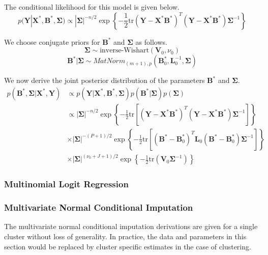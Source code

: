 \documentclass[useAMS,referee]{biom}
\newcommand{\tr}{\mbox{tr}}
\begin{document}
The conditional likelihood for this model is given below. 
$$p(\mathbf{Y}|\mathbf{X}^*,\mathbf{B}^*,\boldsymbol\Sigma) \propto |\boldsymbol\Sigma|^{-n/2}\exp \left \{ -\frac{1}{2} \tr(\mathbf{Y} - \mathbf{X}^* \mathbf{B}^*)^T(\mathbf{Y} - \mathbf{X}^* \mathbf{B}^*)\boldsymbol\Sigma^{-1} \right \}$$

We choose conjugate priors for $\mathbf{B}^*$ and $\boldsymbol\Sigma$ as follows. 
$$\boldsymbol\Sigma \sim \text{inverse-Wishart}(\mathbf{V}_0,\nu_0)$$
$$\mathbf{B}^*|\boldsymbol\Sigma \sim MatNorm_{(m+1), p}(\mathbf{B}_0^*,\mathbf{L}_0^{-1},\boldsymbol\Sigma)$$

We now derive the joint posterior distribution of the parameters $\mathbf{B}^*$ and $\boldsymbol\Sigma$.
\begin{align*} 
p(\mathbf{B}^*,\boldsymbol\Sigma|\mathbf{X}^*,\mathbf{Y}) & \propto  p(\mathbf{Y}|\mathbf{X}^*,\mathbf{B}^*,\boldsymbol\Sigma)p(\mathbf{B}^*|\boldsymbol\Sigma)p(\boldsymbol\Sigma)\\
&  \propto |\boldsymbol\Sigma|^{-n/2}\exp \left \{ -\frac{1}{2} \tr \left [(\mathbf{Y} - \mathbf{X^*}\mathbf{B}^*)^T(\mathbf{Y} - \mathbf{X^*}\mathbf{B}^*)\boldsymbol\Sigma^{-1} \right ]\right \} \\
& \times |\boldsymbol\Sigma|^{-(P+1)/2} \exp \left \{ -\frac{1}{2} \tr \left [(\mathbf{B}^* - \mathbf{B}^*_0)^T \mathbf{L}_0(\mathbf{B}^* - \mathbf{B}^*_0)\boldsymbol\Sigma^{-1} \right ]\right \} \\
& \times |\boldsymbol\Sigma|^{(\nu_0 + J + 1)/2} \exp \left \{ -\frac{1}{2} \tr (\mathbf{V}_0 \boldsymbol\Sigma^{-1}) \right \}
\end{align*}



\subsubsection{Multinomial Logit Regression}

\subsubsection{Multivariate Normal Conditional Imputation}

The multivariate normal conditional imputation derivations are given for a single cluster without loss of generality. In practice, the data and parameters in this section would be replaced by cluster specific estimates in the case of clustering. 
\end{document}
